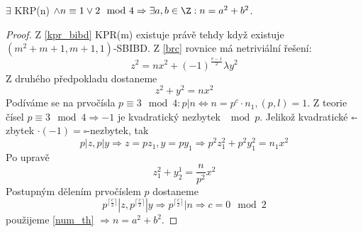 \begin{theorem}
	$\exists$ KRP(n) $\land n \equiv 1 \lor 2 \mod 4 \Rightarrow \exists a, b \in \Z: n = a^2 + b^2$.
\end{theorem}
\begin{proof}
	Z \cref{kpr_bibd} KPR(m) existuje právě tehdy když existuje $(m^2 + m + 1, m + 1, 1)$-SBIBD.
	Z \cref{brc} rovnice má netriviální řešení:
	\[ z^2 = nx^2 + (-1)^{\frac{v - 1}{2}} \lambda y^2\]
	Z druhého předpokladu dostaneme
	\[ z^2 + y^2 = n x^2 \]
	Podíváme se na prvočísla $p \equiv 3 \mod4: p | n \iff n = p^c \cdot n_1, (p, l) = 1$.
	Z teorie čísel $p \equiv 3 \mod4 \Rightarrow -1$ je kvadratický nezbytek $\mod p$.
	Jelikož kvadratické $\square$-zbytek $\cdot (-1) = \square$-nezbytek, tak
	\[ p | z, p| y \Rightarrow z = p z_1, y = p y_1 \Rightarrow p^2 z_1^2 + p^2 y_1^2 = n_1 x^2 \]
	Po upravě
	\[ z_1^2 + y_2^1 = \frac{n}{p^2} x^2 \]
	Postupným dělením prvočíslem $p$ dostaneme
	\[ p^{\lceil \frac{c}{2} \rceil} | z, p^{\lceil \frac{c}{2} \rceil} | y \Rightarrow p^{\lceil \frac{c}{2} \rceil} | n \Rightarrow c = 0 \mod 2 \]
	použijeme \cref{num_th} $\Rightarrow n = a^2 + b^2$.
\end{proof}
